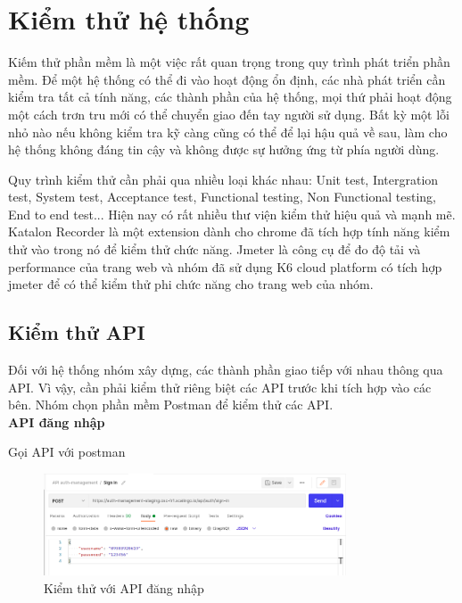 \chapter{Kiểm thử hệ thống}\label{chap:testing}
		Kiếm thử phần mềm là một việc rất quan trọng trong quy trình phát triển phần mềm.
        Để một hệ thống có thể đi vào hoạt động ổn định, các nhà phát triển cần kiểm tra tất
        cả tính năng, các thành phần của hệ thống, mọi thứ phải hoạt động một cách trơn tru
        mới có thể chuyển giao đến tay người sử dụng. Bất kỳ một lỗi nhỏ nào nếu không kiểm
        tra kỹ càng cũng có thể để lại hậu quả về sau, làm cho hệ thống không đáng tin cậy và
        không được sự hưởng ứng từ phía người dùng.
        
        Quy trình kiểm thử cần phải qua nhiều loại khác nhau: Unit test, Intergration test, System test, Acceptance test, Functional testing, Non Functional testing, End to end test... Hiện nay có rất nhiều thư viện kiểm thử hiệu quả và mạnh mẽ. Katalon Recorder là một extension dành cho chrome đã tích hợp tính năng kiểm thử vào trong nó để kiểm thử chức năng. Jmeter là công cụ để đo độ tải và performance của trang web và nhóm đã sử dụng K6 cloud platform có tích hợp jmeter để có thể kiểm thử phi chức năng cho trang web của nhóm.
		\section{Kiểm thử API}
		Đối với hệ thống nhóm xây dựng, các thành phần giao tiếp với nhau thông qua API. Vì vậy, cần phải kiểm thử riêng biệt các API trước khi tích hợp vào các bên. Nhóm chọn phần mềm Postman để kiểm thử các API.\\
		
		\textbf{API đăng nhập}
		
		Gọi API với postman
		
		\begin{figure}[!ht]
			\includegraphics[width=0.8\textwidth]{Images/postman/api_sign_in.png}
			\centering
			\linebreak
			\caption{Kiểm thử với API đăng nhập}
		\end{figure}
		
